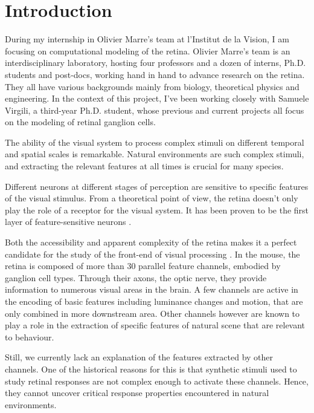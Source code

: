 \section{Introduction}\label{sec:introduction}

During my internship in Olivier Marre's team at l'Institut de la Vision, I am
focusing on computational modeling of the retina. Olivier Marre's team is an
interdisciplinary laboratory, hosting four professors and a dozen of interns,
Ph.D. students and post-docs, working hand in hand to advance research
on the retina. They all have various backgrounds mainly from biology,
theoretical physics and engineering. In the context of this project, I've been
working
closely with Samuele Virgili, a third-year Ph.D. student, whose previous and
current projects all focus on the modeling of retinal ganglion cells.

The ability of the visual system to process complex stimuli on different
temporal and spatial scales is remarkable. %
Natural environments are such complex stimuli, and extracting the relevant
features at all times is crucial for many species.

Different neurons at different stages of perception are sensitive to specific
features of the visual stimulus. From a theoretical point of view, the retina
doesn't only play the role of a receptor for the visual system. It has been
proven to be the first layer of feature-sensitive
neurons \cite{gollisch_eye_2010}.

Both the accessibility and apparent complexity	of the retina makes it a
perfect candidate for the study of the front-end of visual processing
\citep{gollisch_eye_2010}. In the mouse, the retina is composed of more
than 30 parallel feature channels, embodied by ganglion cell types. Through
their axons, the optic nerve, they provide information to numerous visual areas
in the brain.
A few channels are active in the encoding of basic features including luminance
changes and motion, that are only combined in more downstream area. Other
channels however are known to play a role in the extraction of specific
features of natural scene that are relevant  to behaviour.

Still, we currently lack an explanation of the features extracted by other
channels. One of the historical reasons for this is that synthetic stimuli used
to study retinal responses are not complex enough to activate these channels.
Hence, they cannot uncover critical response properties encountered in natural
environments. %

